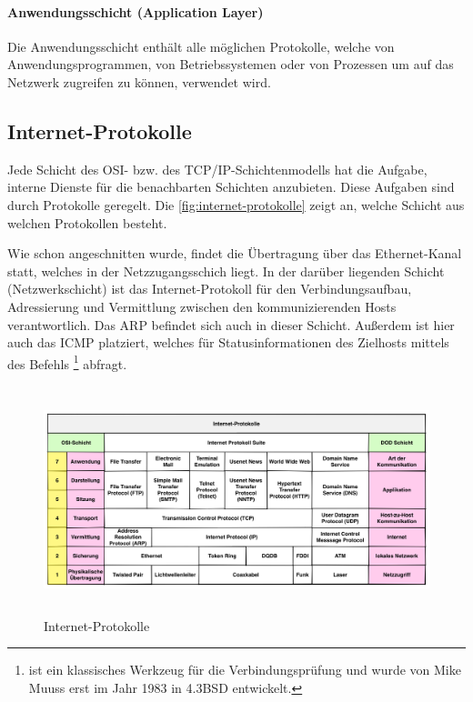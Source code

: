 \paragraph{Anwendungsschicht (Application Layer)} Die Anwendungsschicht enthält alle möglichen Protokolle, welche von Anwendungsprogrammen, von Betriebssystemen oder von Prozessen um auf das Netzwerk zugreifen zu können, verwendet wird. 

\subsection{Internet-Protokolle}

Jede Schicht des OSI- bzw. des TCP/IP-Schichtenmodells hat die Aufgabe, interne Dienste für die benachbarten Schichten anzubieten. Diese Aufgaben sind durch Protokolle geregelt. Die \autoref{fig:internet-protokolle} zeigt an, welche Schicht aus welchen Protokollen besteht. \smallskip \smallskip

Wie schon angeschnitten wurde, findet die Übertragung über das Ethernet-Kanal statt, welches in der Netzzugangsschich liegt. In der darüber liegenden Schicht (Netzwerkschicht) ist das Internet-Protokoll für den Verbindungsaufbau, Adressierung und Vermittlung zwischen den kommunizierenden Hosts verantwortlich. Das ARP befindet sich auch in dieser Schicht. Außerdem ist hier auch das ICMP platziert, welches für Statusinformationen des Zielhosts mittels des Befehls \footnote{ist ein klassisches Werkzeug für die Verbindungsprüfung und wurde von Mike Muuss erst im Jahr 1983 in 4.3BSD entwickelt.} abfragt. \smallskip \smallskip

\begin{figure}[htbp]
	\centering
		\includegraphics[width=450px,height=250px]{pictures/internet-protokolle.png}
	\caption[Internet-Protokolle]{Internet-Protokolle \cite{netzmafia}}\label{fig:internet-protokolle}
\end{figure}

